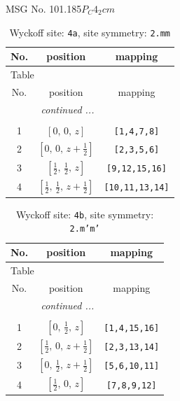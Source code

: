 \documentclass[fleqn,8pt]{jsarticle}
\begin{document}
\setcounter{MaxMatrixCols}{32}

\renewcommand{\tablename}{Table~}
\renewcommand{\figurename}{Figure~}
\begin{center}
\LARGE
MSG No. 101.185\quad$P_{C}4_{2}cm$
\end{center}
\renewcommand{\arraystretch}{1.2}
\begin{longtable}{ccc}
\caption{Wyckoff site: {\tt 4a}, site symmetry: {\tt 2.mm}}
 \\
 \hline \hline
No. & position & mapping \\ \hline \endfirsthead

\multicolumn{2}{l}{\tablename\ \thetable{}} \\
 \hline \hline
No. & position & mapping \\ \hline \endhead

 \hline \hline
\multicolumn{2}{r}{\footnotesize\it continued ...} \\ \endfoot

 \hline \hline
\multicolumn{2}{r}{} \\ \endlastfoot

1 & $\left[ 0,\, 0,\, z \right]$ & {\tt [1,4,7,8]} \\ \hline
2 & $\left[ 0,\, 0,\, z + \frac{1}{2} \right]$ & {\tt [2,3,5,6]} \\ \hline
3 & $\left[ \frac{1}{2},\, \frac{1}{2},\, z \right]$ & {\tt [9,12,15,16]} \\ \hline
4 & $\left[ \frac{1}{2},\, \frac{1}{2},\, z + \frac{1}{2} \right]$ & {\tt [10,11,13,14]} \\
\end{longtable}
\renewcommand{\arraystretch}{1.2}
\begin{longtable}{ccc}
\caption{Wyckoff site: {\tt 4b}, site symmetry: {\tt 2.m'm'}}
 \\
 \hline \hline
No. & position & mapping \\ \hline \endfirsthead

\multicolumn{2}{l}{\tablename\ \thetable{}} \\
 \hline \hline
No. & position & mapping \\ \hline \endhead

 \hline \hline
\multicolumn{2}{r}{\footnotesize\it continued ...} \\ \endfoot

 \hline \hline
\multicolumn{2}{r}{} \\ \endlastfoot

1 & $\left[ 0,\, \frac{1}{2},\, z \right]$ & {\tt [1,4,15,16]} \\ \hline
2 & $\left[ \frac{1}{2},\, 0,\, z + \frac{1}{2} \right]$ & {\tt [2,3,13,14]} \\ \hline
3 & $\left[ 0,\, \frac{1}{2},\, z + \frac{1}{2} \right]$ & {\tt [5,6,10,11]} \\ \hline
4 & $\left[ \frac{1}{2},\, 0,\, z \right]$ & {\tt [7,8,9,12]} \\
\end{longtable}
\end{document}
